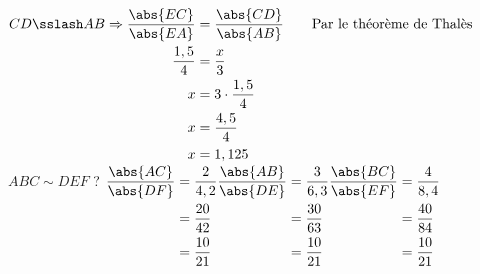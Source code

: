 %
%
    \begin{tasks}
        \task
        $
            \begin{aligned}[t]
                CD \sslash AB \Rightarrow
                \dfrac{\abs{EC}}{\abs{EA}} & = \dfrac{\abs{CD}}{\abs{AB}}
                \qquad\text{Par le théorème de Thalès}                    \\
                \dfrac{1,5}{4}             & = \dfrac{x}{3}               \\
                x                          & = 3\cdot\dfrac{1,5}{4}       \\
                x                          & = \dfrac{4,5}{4}             \\
                x                          & = 1,125
            \end{aligned}
        $
        \task $ABC \sim DEF$ ?
        $
            \begin{aligned}[t]
                \dfrac{\abs{AC}}{\abs{DF}}
                 & = \dfrac{2}{4,2} \\
                 & = \dfrac{20}{42} \\
                 & = \dfrac{10}{21} \\
            \end{aligned}
            \hfil
            \begin{aligned}[t]
                \dfrac{\abs{AB}}{\abs{DE}}
                 & = \dfrac{3}{6,3} \\
                 & = \dfrac{30}{63} \\
                 & = \dfrac{10}{21} \\
            \end{aligned}
            \hfil
            \begin{aligned}[t]
                \dfrac{\abs{BC}}{\abs{EF}}
                 & = \dfrac{4}{8,4} \\
                 & = \dfrac{40}{84} \\
                 & = \dfrac{10}{21}
            \end{aligned}
        $\bigbreak


\end{tasks}

